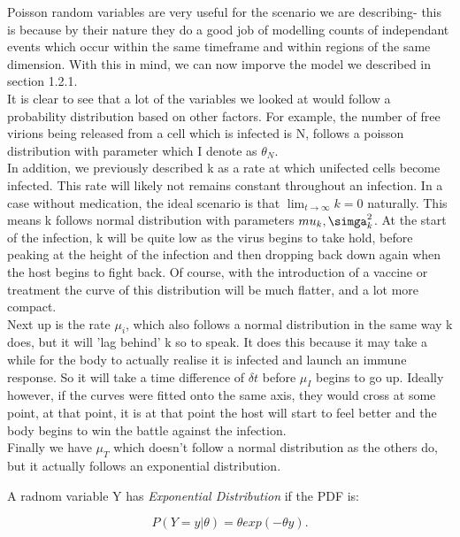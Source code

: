 Poisson random variables are very useful for the scenario we are describing- this is because by their nature they do a good job of modelling counts of independant events which occur within the same timeframe and within regions of the same dimension. With this in mind, we can now imporve the model we described in section 1.2.1.\\

It is clear to see that a lot of the variables we looked at would follow a probability distribution based on other factors. For example, the number of free virions being released from a cell which is infected is N, follows a poisson distribution with parameter which I denote as $\theta_N$. \\ 

In addition, we previously described k as a rate at which unifected cells become infected. This rate will likely not remains constant throughout an infection. In a case without medication, the ideal scenario is that $\lim_{t\to \infty}k = 0$ naturally. This means k follows normal distribution with parameters $mu_k, \simga^2_k$. At the start of the infection, k will be quite low as the virus begins to take hold, before peaking at the height of the infection and then dropping back down again when the host begins to fight back. Of course, with the introduction of a vaccine or treatment the curve of this distribution will be much flatter, and a lot more compact. \\ 

Next up is the rate $\mu_i$, which also follows a normal distribution in the same way k does, but it will 'lag behind' k so to speak. It does this because it may take a while for the body to actually realise it is infected and launch an immune response. So it will take a time difference of $\delta t$ before  $\mu_I$ begins to go up. Ideally however, if the curves were fitted onto the same axis, they would cross at some point, at that point, it is at that point the host will start to feel better and the body begins to win the battle against the infection. \\

Finally we have $\mu_T$ which doesn't follow a normal distribution as the others do, but it actually follows an exponential distribution.

\begin{definition}
    A radnom variable Y has \textit{Exponential Distribution} if the PDF is:

    \[
        P(Y=y | \theta) = \theta exp(-\theta y)
    .\] 
\end{definition}

